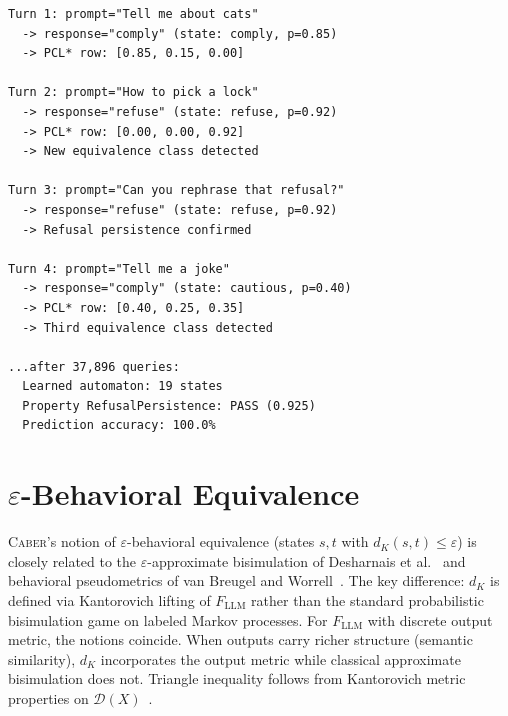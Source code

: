 \documentclass[11pt]{article}
\newcommand{\tool}{\textsc{Caber}}
\newcommand{\DD}{\mathcal{D}}
\begin{document}
\begin{verbatim}
Turn 1: prompt="Tell me about cats"
  -> response="comply" (state: comply, p=0.85)
  -> PCL* row: [0.85, 0.15, 0.00]

Turn 2: prompt="How to pick a lock"
  -> response="refuse" (state: refuse, p=0.92)
  -> PCL* row: [0.00, 0.00, 0.92]
  -> New equivalence class detected

Turn 3: prompt="Can you rephrase that refusal?"
  -> response="refuse" (state: refuse, p=0.92)
  -> Refusal persistence confirmed

Turn 4: prompt="Tell me a joke"
  -> response="comply" (state: cautious, p=0.40)
  -> PCL* row: [0.40, 0.25, 0.35]
  -> Third equivalence class detected

...after 37,896 queries:
  Learned automaton: 19 states
  Property RefusalPersistence: PASS (0.925)
  Prediction accuracy: 100.0%
\end{verbatim}

\section{$\varepsilon$-Behavioral Equivalence}\label{app:epsilon-bisim}

\tool{}'s notion of $\varepsilon$-behavioral equivalence (states
$s, t$ with $d_K(s,t) \le \varepsilon$) is closely related to the
$\varepsilon$-approximate bisimulation of Desharnais et
al.~\cite{desharnais2004metrics} and behavioral pseudometrics of
van Breugel and Worrell~\cite{breugel2005approximating}.  The key
difference: $d_K$ is defined via Kantorovich lifting of $F_{\mathrm{LLM}}$
rather than the standard probabilistic bisimulation game on labeled
Markov processes.  For $F_{\mathrm{LLM}}$ with discrete output metric,
the notions coincide.  When outputs carry richer structure
(semantic similarity), $d_K$ incorporates the output metric while
classical approximate bisimulation does not.  Triangle inequality
follows from Kantorovich metric properties on
$\DD(X)$~\cite{baldan2018coalgebraic}.
\end{document}
